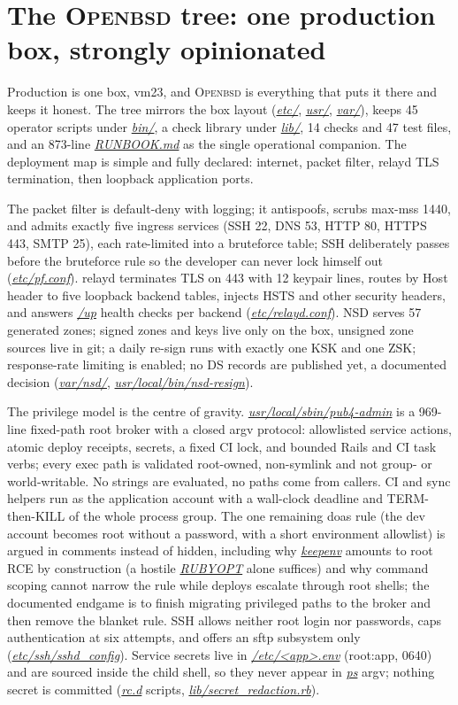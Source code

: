 \documentclass[oneside]{article}
\newcommand{\treename}[1]{\mbox{\textsc{#1}}}
\newcommand{\otree}{\treename{Openbsd}}
\newcommand{\fpath}[1]{\emph{\url{#1}}}
\begin{document}
\section{The \otree{} tree: one production box, strongly opinionated}

Production is one box, vm23, and \otree{} is everything that puts it there and keeps it honest. The tree mirrors the box layout (\fpath{etc/}, \fpath{usr/}, \fpath{var/}), keeps 45 operator scripts under \fpath{bin/}, a check library under \fpath{lib/}, 14 checks and 47 test files, and an 873-line \fpath{RUNBOOK.md} as the single operational companion. The deployment map is simple and fully declared: internet, packet filter, relayd TLS termination, then loopback application ports.

The packet filter is default-deny with logging; it antispoofs, scrubs max-mss 1440, and admits exactly five ingress services (SSH 22, DNS 53, HTTP 80, HTTPS 443, SMTP 25), each rate-limited into a bruteforce table; SSH deliberately passes before the bruteforce rule so the developer can never lock himself out (\fpath{etc/pf.conf}). relayd terminates TLS on 443 with 12 keypair lines, routes by Host header to five loopback backend tables, injects HSTS and other security headers, and answers \fpath{/up} health checks per backend (\fpath{etc/relayd.conf}). NSD serves 57 generated zones; signed zones and keys live only on the box, unsigned zone sources live in git; a daily re-sign runs with exactly one KSK and one ZSK; response-rate limiting is enabled; no DS records are published yet, a documented decision (\fpath{var/nsd/}, \fpath{usr/local/bin/nsd-resign}).

The privilege model is the centre of gravity. \fpath{usr/local/sbin/pub4-admin} is a 969-line fixed-path root broker with a closed argv protocol: allowlisted service actions, atomic deploy receipts, secrets, a fixed CI lock, and bounded Rails and CI task verbs; every exec path is validated root-owned, non-symlink and not group- or world-writable. No strings are evaluated, no paths come from callers. CI and sync helpers run as the application account with a wall-clock deadline and TERM-then-KILL of the whole process group. The one remaining doas rule (the dev account becomes root without a password, with a short environment allowlist) is argued in comments instead of hidden, including why \fpath{keepenv} amounts to root RCE by construction (a hostile \fpath{RUBYOPT} alone suffices) and why command scoping cannot narrow the rule while deploys escalate through root shells; the documented endgame is to finish migrating privileged paths to the broker and then remove the blanket rule. SSH allows neither root login nor passwords, caps authentication at six attempts, and offers an sftp subsystem only (\fpath{etc/ssh/sshd_config}). Service secrets live in \fpath{/etc/<app>.env} (root:app, 0640) and are sourced inside the child shell, so they never appear in \fpath{ps} argv; nothing secret is committed (\fpath{rc.d} scripts, \fpath{lib/secret_redaction.rb}).
\end{document}

